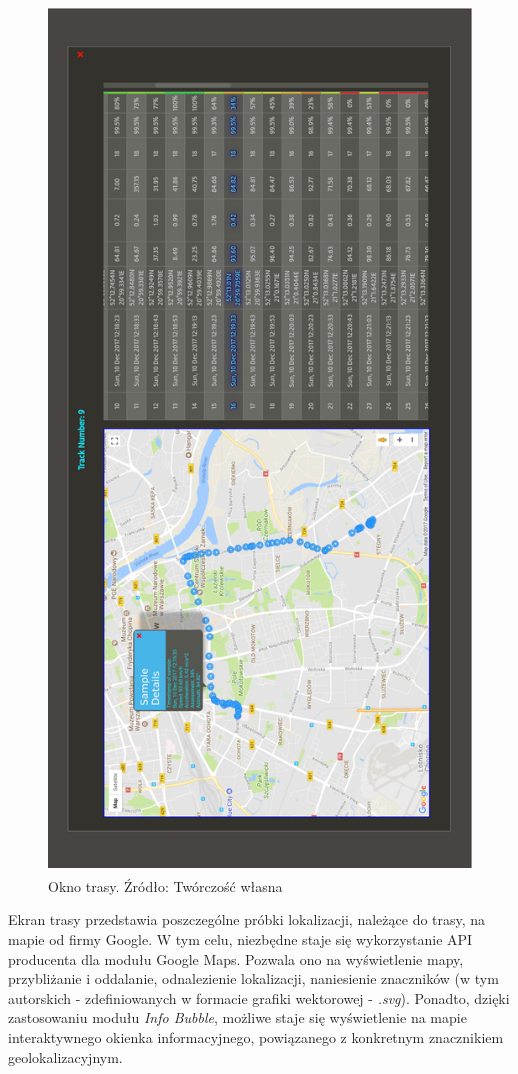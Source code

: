 \begin{figure}[H]
	\centering
	\includegraphics[height=23cm, width=16cm]{img/software/website/track_modal.png}
	\caption{Okno trasy. Źródło: Twórczość własna}
	\label{fig:image_soft_website_track_map}
\end{figure}

\clearpage
Ekran trasy przedstawia poszczególne próbki lokalizacji, należące do trasy, na mapie od firmy Google. W tym celu, niezbędne staje się wykorzystanie API producenta dla modułu Google Maps. Pozwala ono na wyświetlenie mapy, przybliżanie i oddalanie, odnalezienie lokalizacji, naniesienie znaczników (w tym autorskich - zdefiniowanych w formacie grafiki wektorowej - \textit{.svg}). Ponadto, dzięki zastosowaniu modułu \textit{Info Bubble}, możliwe staje się wyświetlenie na mapie interaktywnego okienka informacyjnego, powiązanego z konkretnym znacznikiem geolokalizacyjnym.

